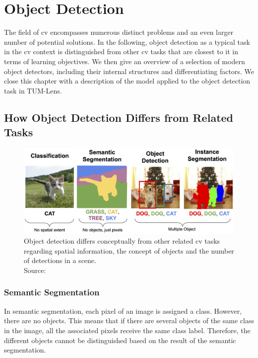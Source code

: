 \documentclass[
			   fontsize=11pt,
               paper=a4,
               bibliography=totoc,
               idxtotoc,
               headsepline,
               footsepline,
               footinclude=false,
               BCOR=12mm,
               DIV=13,
               openany,   %
               ]
               {scrbook}
\begin{document}
\chapter{Object Detection}

The field of \gls{cv} encompasses numerous distinct problems and an even larger number of potential solutions. In the following, object detection as a typical task in the \gls{cv} context is distinguished from other \gls{cv} tasks that are closest to it in terms of learning objectives. We then give an overview of a selection of modern object detectors, including their internal structures and differentiating factors. We close this chapter with a description of the model applied to the object detection task in TUM-Lens.

\section{How Object Detection Differs from Related Tasks} \label{sec:cvtasks}

\begin{figure}[H] %
	\centering
	\includegraphics[width=\textwidth]{figures/detection_related_tasks.png}
	\caption[Typical Computer Vision Tasks]{Object detection differs conceptually from other related \gls{cv} tasks regarding spatial information, the concept of objects and the number of detections in a scene.\\
		\tiny{Source:~\cite{cvTasks}}}
	\label{fig:cvTasks} %
\end{figure}

\subsection{Semantic Segmentation}
In semantic segmentation, each pixel of an image is assigned a class. However, there are no objects. This means that if there are several objects of the same class in the image, all the associated pixels receive the same class label. Therefore, the different objects cannot be distinguished based on the result of the semantic segmentation.
\end{document}
